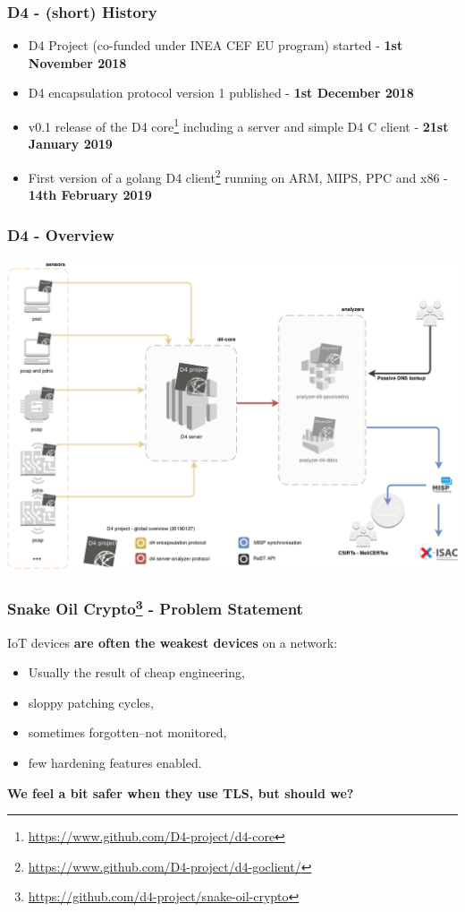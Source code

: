 \documentclass{beamer}
\begin{document}
\begin{frame}
        \frametitle{D4 - (short) History}
 \begin{itemize}
        \item D4 Project (co-funded under INEA CEF EU program) started - {\bf 1st November 2018}
        \item D4 encapsulation protocol version 1 published  - {\bf 1st December 2018}
        \item v0.1 release of the D4 core\footnote{\url{https://www.github.com/D4-project/d4-core}} including a server and simple D4 C client - {\bf 21st January 2019}
        \item First version of a golang D4
          client\footnote{\url{https://www.github.com/D4-project/d4-goclient/}}
          running on ARM, MIPS, PPC and x86 - {\bf 14th February 2019}
 \end{itemize}
\end{frame}

\begin{frame}
\frametitle{D4 - Overview}
        \includegraphics[scale=0.38]{../../diagram/d4-overview.png}
\end{frame}


\begin{frame}
  \frametitle{Snake Oil Crypto\footnote{\url{https://github.com/d4-project/snake-oil-crypto}} - Problem Statement}
  IoT devices {\bf are often the weakest devices} on a network:
        \begin{itemize}
        \item Usually the result of cheap engineering,
        \item sloppy patching cycles,
        \item sometimes forgotten--not monitored,
        \item few hardening features enabled.
        \end{itemize}

        \vspace{10 mm} 

{\bf We feel a bit safer when they use TLS, but should we?}

\end{frame}
\end{document}
